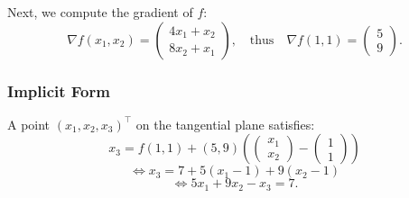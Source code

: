 \documentclass{article}
\begin{document}
Next, we compute the gradient of \( f \):
\[
\nabla f(x_{1}, x_{2}) = \begin{pmatrix} 4x_{1} + x_{2} \\ 8x_{2} + x_{1} \end{pmatrix}, \quad \text{thus} \quad \nabla f(1,1) = \begin{pmatrix} 5 \\ 9 \end{pmatrix}.
\]

\subsubsection*{Implicit Form}
A point \( (x_{1}, x_{2}, x_{3})^{\top} \) on the tangential plane satisfies:
\[
x_{3} = f(1,1) + (5,9) \left( \begin{pmatrix} x_{1} \\ x_{2} \end{pmatrix} - \begin{pmatrix} 1 \\ 1 \end{pmatrix} \right)
\]
\[
\Leftrightarrow x_{3} = 7 + 5(x_{1} - 1) + 9(x_{2} - 1)
\]
\[
\Leftrightarrow 5x_{1} + 9x_{2} - x_{3} = 7.
\]
\end{document}
